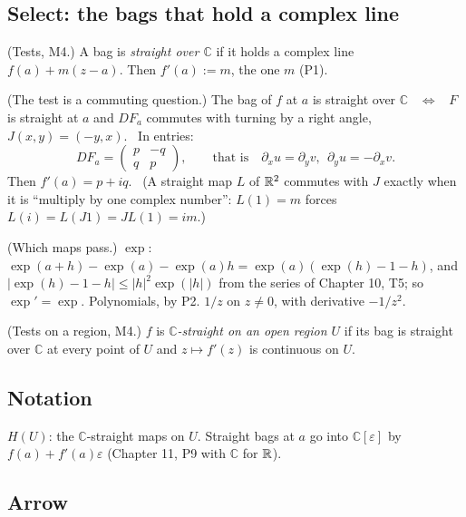 \subsection*{Select: the bags that hold a complex line}

\begin{lines}
\item[\lab{D4}] (Tests, M4.) A bag is \emph{straight over $\mathbb{C}$} if it holds a complex line $f(a) + m(z - a)$. Then $f'(a) := m$, the one $m$ (P1).
\item[\lab{T1}] (The test is a commuting question.) The bag of $f$ at $a$ is straight over $\mathbb{C}$ \ $\iff$ \ $F$ is straight at $a$ and $DF_a$ commutes with turning by a right angle, $J(x, y) = (-y, x)$. \ In entries: \[ DF_a = \begin{pmatrix} p & -q \\ q & p \end{pmatrix}, \qquad \text{that is} \quad \partial_x u = \partial_y v, \ \ \partial_y u = -\partial_x v . \] Then $f'(a) = p + iq$. \ (A straight map $L$ of $\mathbb{R}^2$ commutes with $J$ exactly when it is ``multiply by one complex number'': $L(1) = m$ forces $L(i) = L(J 1) = J L(1) = im$.)
\item[\lab{P5}] (Which maps pass.) $\exp$: $\exp(a + h) - \exp(a) - \exp(a)h = \exp(a)(\exp(h) - 1 - h)$, and $|\exp(h) - 1 - h| \le |h|^2 \exp(|h|)$ from the series of Chapter 10, T5; so $\exp' = \exp$. Polynomials, by P2. $1/z$ on $z \ne 0$, with derivative $-1/z^2$.
\item[\lab{D5}] (Tests on a region, M4.) $f$ is \emph{$\mathbb{C}$-straight on an open region $U$} if its bag is straight over $\mathbb{C}$ at every point of $U$ and $z \mapsto f'(z)$ is continuous on $U$.
\end{lines}

\subsection*{Notation}

\begin{lines}
\item[\lab{N1}] $H(U)$: the $\mathbb{C}$-straight maps on $U$. Straight bags at $a$ go into $\mathbb{C}[\varepsilon]$ by $f(a) + f'(a)\varepsilon$ (Chapter 11, P9 with $\mathbb{C}$ for $\mathbb{R}$).
\end{lines}

\subsection*{Arrow}

